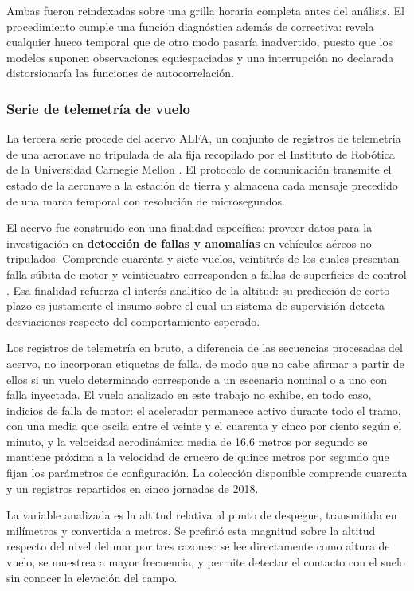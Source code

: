 Ambas fueron reindexadas sobre una grilla horaria completa antes del análisis. El
procedimiento cumple una función diagnóstica además de correctiva: revela cualquier hueco
temporal que de otro modo pasaría inadvertido, puesto que los modelos suponen observaciones
equiespaciadas y una interrupción no declarada distorsionaría las funciones de autocorrelación.

\subsubsection{Serie de telemetría de vuelo}

La tercera serie procede del acervo ALFA, un conjunto de registros de telemetría de una
aeronave no tripulada de ala fija recopilado por el Instituto de Robótica de la Universidad
Carnegie Mellon \parencite{keipour2020}. El protocolo de comunicación transmite el estado de la
aeronave a la estación de tierra y almacena cada mensaje precedido de una marca temporal con
resolución de microsegundos.

El acervo fue construido con una finalidad específica: proveer datos para la investigación en
\textbf{detección de fallas y anomalías} en vehículos aéreos no tripulados. Comprende cuarenta y
siete vuelos, veintitrés de los cuales presentan falla súbita de motor y veinticuatro
corresponden a fallas de superficies de control \parencite{keipour2021}. Esa finalidad refuerza el interés analítico de la altitud: su predicción de corto plazo es justamente el insumo sobre el cual un sistema de supervisión detecta desviaciones respecto del comportamiento
esperado.

Los registros de telemetría en bruto, a diferencia de las secuencias procesadas del acervo, no
incorporan etiquetas de falla, de modo que no cabe afirmar a partir de ellos si un vuelo
determinado corresponde a un escenario nominal o a uno con falla inyectada. El vuelo analizado
en este trabajo no exhibe, en todo caso, indicios de falla de motor: el acelerador permanece
activo durante todo el tramo, con una media que oscila entre el veinte y el cuarenta y cinco por
ciento según el minuto, y la velocidad aerodinámica media de 16,6 metros por segundo se mantiene
próxima a la velocidad de crucero de quince metros por segundo que fijan los parámetros de
configuración. La colección disponible comprende cuarenta y un registros repartidos en cinco
jornadas de 2018.

La variable analizada es la altitud relativa al punto de despegue, transmitida en milímetros
y convertida a metros. Se prefirió esta magnitud sobre la altitud respecto del nivel del mar
por tres razones: se lee directamente como altura de vuelo, se muestrea a mayor
frecuencia, y permite detectar el contacto con el suelo sin conocer la elevación del campo.

